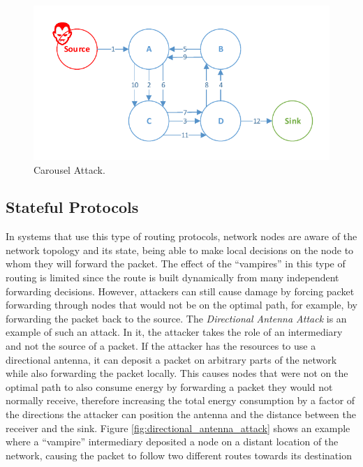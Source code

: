 \documentclass{sig-alternate-05-2015}
\begin{document}
\begin{figure}[h]
  \centering
  \includegraphics[width=0.9\linewidth]{figures/Carousel_Attack.pdf}
  \caption{Carousel Attack.}
  \label{fig:carousel_attack}
\end{figure}

\subsection{Stateful Protocols}
\label{sec:tables_routing}
In systems that use this type of routing protocols, network nodes are aware of the network topology and its state, being able to make local decisions on the node to whom they will forward the packet. 
The effect of the ``vampires'' in this type of routing is limited since the route is built dynamically from many independent forwarding decisions. 
However, attackers can still cause damage by forcing packet forwarding through nodes that would not be on the optimal path, for example, by forwarding the packet back to the source. 
The \emph{Directional Antenna Attack} is an example of such an attack. 
In it, the attacker takes the role of an intermediary and not the source of a packet. 
If the attacker has the resources to use a directional antenna, it can deposit a packet on arbitrary parts of the network while also forwarding the packet locally. 
This causes nodes that were not on the optimal path to also consume energy by forwarding a packet they would not normally receive, therefore increasing the total energy consumption by a factor of the directions the attacker can position the antenna and the distance between the receiver and the sink. 
Figure \ref{fig:directional_antenna_attack} shows an example where a ``vampire'' intermediary deposited a node on a distant location of the network, causing the packet to follow two different routes towards its destination
\end{document}

